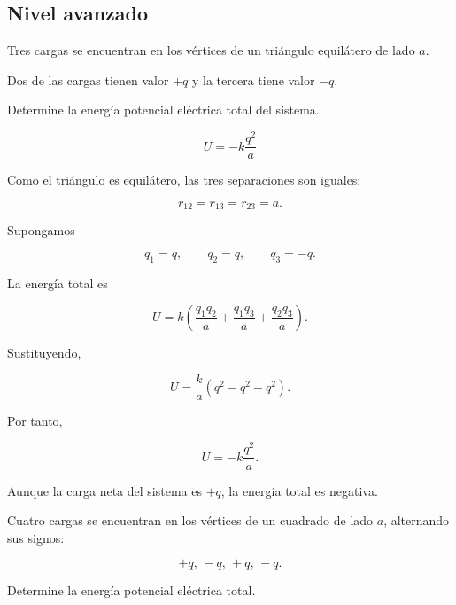 \subsection{Nivel avanzado}

\begin{ejercicio}

Tres cargas se encuentran en los vértices de un triángulo equilátero de lado \(a\).

Dos de las cargas tienen valor \(+q\) y la tercera tiene valor \(-q\).

Determine la energía potencial eléctrica total del sistema.

\end{ejercicio}

\begin{respuesta}

\[
\boxed{
U=-k\frac{q^2}{a}
}
\]

\end{respuesta}

\begin{explicacion}

Como el triángulo es equilátero, las tres separaciones son iguales:

\[
r_{12}=r_{13}=r_{23}=a.
\]

Supongamos

\[
q_1=q,
\qquad
q_2=q,
\qquad
q_3=-q.
\]

La energía total es

\[
U
=
k
\left(
\frac{q_1q_2}{a}
+
\frac{q_1q_3}{a}
+
\frac{q_2q_3}{a}
\right).
\]

Sustituyendo,

\[
U
=
\frac{k}{a}
\left(
q^2-q^2-q^2
\right).
\]

Por tanto,

\[
\boxed{
U=-k\frac{q^2}{a}
}.
\]

Aunque la carga neta del sistema es \(+q\), la energía total es negativa.

\end{explicacion}


\begin{ejercicio}

Cuatro cargas se encuentran en los vértices de un cuadrado de lado \(a\), alternando
sus signos:

\[
+q,\,-q,\,+q,\,-q.
\]

\begin{center}
\end{center}

Determine la energía potencial eléctrica total.

\end{ejercicio}

